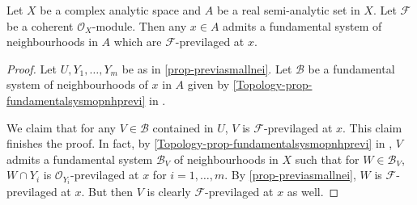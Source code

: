 \begin{proposition}\label{prop-existprenh}
    Let $X$ be a complex analytic space and $A$ be a real semi-analytic set in $X$. Let $\mathcal{F}$ be a coherent $\mathcal{O}_X$-module. Then any $x\in A$ admits a fundamental system of neighbourhoods in $A$ which are $\mathcal{F}$-previlaged at $x$.
\end{proposition}
\begin{proof}
    Let $U,Y_1,\ldots,Y_m$ be as in \cref{prop-previasmallnei}. Let $\mathcal{B}$ be a fundamental system of neighbourhoods of $x$ in $A$ given by \cref{Topology-prop-fundamentalsysmopnhprevi} in . 
    
    We claim that for any $V\in \mathcal{B}$ contained in $U$, $V$ is $\mathcal{F}$-previlaged at $x$. This claim finishes the proof. In fact, by  \cref{Topology-prop-fundamentalsysmopnhprevi} in , $V$ admits a fundamental system $\mathcal{B}_V$ of neighbourhoods in $X$ such that for $W\in \mathcal{B}_V$, $W\cap Y_i$ is $\mathcal{O}_{Y_i}$-previlaged at $x$ for $i=1,\ldots,m$.  By \cref{prop-previasmallnei}, $W$ is $\mathcal{F}$-previlaged at $x$. But then $V$ is clearly $\mathcal{F}$-previlaged at $x$ as well.
\end{proof}

